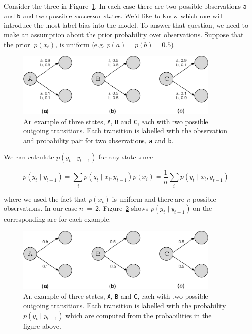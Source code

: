 \documentclass[11pt, letterpaper]{article}
\begin{document}
Consider the three in Figure~\ref{fig:entropy}. In each case there are two possible
observations \texttt{a} and \texttt{b} and two possible successor states. We'd
like to know which one will introduce the most label bias into the model. To
answer that question, we need to make an assumption about the prior probability
over observations. Suppose that the prior, $p(x_t)$, is uniform (e.g. $p(a) =
p(b) = 0.5$).

\begin{figure}
    \centering
    \includegraphics[width=0.9\textwidth]{figures/entropy_example.pdf}
    \caption{An example of three states, \texttt{A}, \texttt{B} and \texttt{C},
    each with two possible outgoing transitions. Each transition is labelled
    with the observation and probability pair for two observations, \texttt{a}
    and \texttt{b}.}
    \label{fig:entropy}
\end{figure}

We can calculate $p(y_t \mid y_{t-1})$ for any state since

\begin{equation}
p(y_t \mid y_{t-1}) = \sum_i p(y_t \mid x_i, y_{t-1}) p(x_i) = \frac{1}{n} \sum_i p(y_t \mid x_i, y_{t-1})
\end{equation}

where we used the fact that $p(x_t)$ is uniform and there are $n$ possible
observations. In our case $n\!~=\!~2$. Figure~\ref{fig:entropy_no_obs} shows
$p(y_t \mid y_{t-1})$ on the corresponding arc for each example.

\begin{figure}
    \centering
    \includegraphics[width=0.9\textwidth]{figures/entropy_example_no_obs.pdf}
    \caption{An example of three states, \texttt{A}, \texttt{B} and \texttt{C},
    each with two possible outgoing transitions.  Each transition is labelled
    with the probability $p(y_t \mid y_{t-1})$ which are computed from the
    probabilities in the figure above.}
    \label{fig:entropy_no_obs}
\end{figure}
\end{document}
